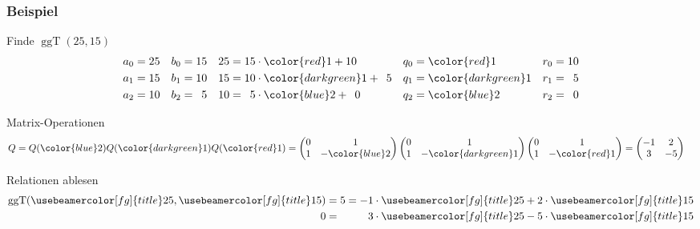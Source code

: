 %
%
%
\bgroup
{}
\begin{frame}[t]
\frametitle{Beispiel}
\setlength{\abovedisplayskip}{0pt}
\setlength{\belowdisplayskip}{0pt}
\vspace{-0pt}
\begin{block}{Finde $\operatorname{ggT}(25,15)$}
\vspace{-12pt}
\begin{align*}
a_0&=25 & b_0 &= 15 &25&=15 \cdot {\color{red}      1} + 10 &q_0 &= {\color{red}1} & r_0 &= 10\\
a_1&=15 & b_1 &= 10 &15&=10 \cdot {\color{darkgreen}1} + \phantom{0}5  &q_1 &= {\color{darkgreen}1} & r_1 &= \phantom{0}5 \\
a_2&=10 & b_2 &= \phantom{0}5 &10&=\phantom{0}5  \cdot {\color{blue}     2} + \phantom{0}0  &q_2 &= {\color{blue}2} & r_2 &= \phantom{0}0 
\end{align*}
\end{block}
\vspace{-5pt}
\begin{block}{Matrix-Operationen}
\begin{align*}
Q
&=
Q({\color{blue}2}) Q({\color{darkgreen}1}) Q({\color{red}1})
=
\begin{pmatrix}0&1\\1&-{\color{blue}2}\end{pmatrix}
\begin{pmatrix}0&1\\1&-{\color{darkgreen}1}\end{pmatrix}
\begin{pmatrix}0&1\\1&-{\color{red}1}\end{pmatrix}
=\begin{pmatrix}
-1&2\\3&-5
\end{pmatrix}
\end{align*}
\end{block}
\vspace{-5pt}
\begin{block}{Relationen ablesen}
\begin{align*}
\operatorname{ggT}({\usebeamercolor[fg]{title}25},{\usebeamercolor[fg]{title}15}) &= 5 = -1\cdot {\usebeamercolor[fg]{title}25} + 2\cdot {\usebeamercolor[fg]{title}15} \\
 0                        &= \phantom{5=-}3\cdot {\usebeamercolor[fg]{title}25} -5\cdot {\usebeamercolor[fg]{title}15}
\end{align*}
\end{block}

\end{frame}
